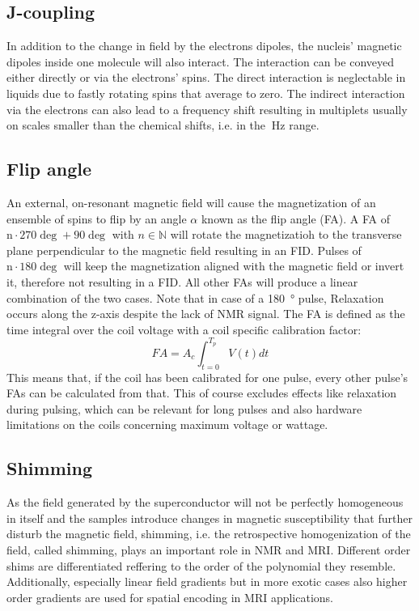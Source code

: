         \subsection{J-coupling}
            In addition to the change in field by the electrons dipoles, the nucleis' magnetic dipoles inside one molecule will also interact. The interaction can be conveyed either directly or via the electrons' spins. The direct interaction is neglectable in liquids due to fastly rotating spins that average to zero. The indirect interaction via the electrons can also lead to a frequency shift resulting in multiplets usually on scales smaller than the chemical shifts, i.e. in the $\SI{}{\hertz}$ range.
        \subsection{Flip angle}
            An external, on-resonant magnetic field will cause the magnetization of an ensemble of spins to flip by an angle $\alpha$ known as the flip angle (FA). A FA of $\mathrm n\cdot 270 \deg + 90 \deg$ with $n \in \mathbb{N}$ will rotate the magnetizatioh to the transverse plane perpendicular to the magnetic field resulting in an FID. Pulses of $\mathrm n\cdot 180 \deg$ will keep the magnetization aligned with the magnetic field or invert it, therefore not resulting in a FID. All other FAs will produce a linear combination of the two cases. Note that in case of a \SI{180}{\degree} pulse, Relaxation occurs along the z-axis despite the lack of NMR signal. The FA is defined as the time integral over the coil voltage with a coil specific calibration factor:
            \begin{equation}
                FA = A_c \int_{t=0}^{T_p}{V(t)dt}
            \end{equation}
            This means that, if the coil has been calibrated for one pulse, every other pulse's FAs can be calculated from that. This of course excludes effects like relaxation during pulsing, which can be relevant for long pulses and also hardware limitations on the coils concerning maximum voltage or wattage.
        \subsection{Shimming}
        As the field generated by the superconductor will not be perfectly homogeneous in itself and the samples introduce changes in magnetic susceptibility that further disturb the magnetic field, shimming, i.e. the retrospective homogenization of the field, called shimming, plays an important role in NMR and MRI. Different order shims are differentiated reffering to the order of the polynomial they resemble. Additionally, especially linear field gradients but in more exotic cases also higher order gradients are used for spatial encoding in MRI applications.
